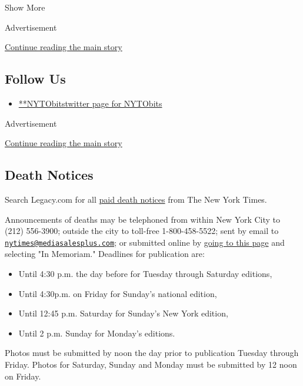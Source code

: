 Show More

Advertisement

\protect\hyperlink{after-mid3}{Continue reading the main story}

\hypertarget{follow-us}{%
\subsection{Follow Us}\label{follow-us}}

\begin{itemize}
\tightlist
\item
  \href{https://twitter.com/NYTObits}{**NYTObitstwitter page for
  NYTObits}
\end{itemize}

Advertisement

\protect\hyperlink{after-mktg}{Continue reading the main story}

\hypertarget{death-notices}{%
\subsection{Death Notices}\label{death-notices}}

Search Legacy.com for all \href{https://www.legacy.com/NYTimes/}{paid
death notices} from The New York Times.

Announcements of deaths may be telephoned from within New York City to
(212) 556-3900; outside the city to toll-free 1-800-458-5522; sent by
email to
\href{mailto:nytimes@mediasalesplus.com}{\nolinkurl{nytimes@mediasalesplus.com}};
or submitted online by
\href{https://advertising.nytimes3xbfgragh.onion/irj/go/nyt/prtroot/fwk/classified}{going
to this page} and selecting "In Memoriam." Deadlines for publication
are:

\begin{itemize}
\tightlist
\item
  Until 4:30 p.m. the day before for Tuesday through Saturday editions,
\item
  Until 4:30p.m. on Friday for Sunday's national edition,
\item
  Until 12:45 p.m. Saturday for Sunday's New York edition,
\item
  Until 2 p.m. Sunday for Monday's editions.
\end{itemize}

Photos must be submitted by noon the day prior to publication Tuesday
through Friday. Photos for Saturday, Sunday and Monday must be submitted
by 12 noon on Friday.

